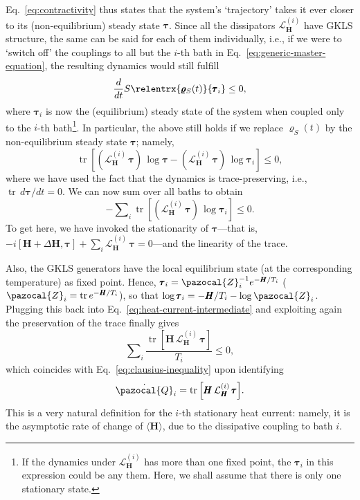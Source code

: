 \documentclass[aps,pra,superscriptaddress,twocolumn,nofootinbib]{revtex4-2}
\newcommand{\relentr}{S\relentrx}
\DeclareMathOperator{\tr}{tr}
\begin{document}
Eq.~\eqref{eq:contractivity} thus states that the system's `trajectory' takes it ever closer to its (non-equilibrium) steady state $\pmb{\tau}$. Since all the dissipators $\mathcal{L}_{\pmb{H}}^{(i)}$ have GKLS structure, the same can be said for each of them individually, i.e., if we were to `switch off' the couplings to all but the $i$-th bath in Eq.~\eqref{eq:generic-master-equation}, the resulting dynamics would still fulfill
\begin{equation*}
    \frac{d}{dt}\relentr{\pmb{\varrho}_S(t)}{\pmb{\tau}_i}\leq 0,
\end{equation*}
where $\pmb{\tau}_i$ is now the (equilibrium) steady state of the system when coupled only to the $i$-th bath\footnote{If the dynamics under $\mathcal{L}_{\pmb{H}}^{(i)}$ has more than one fixed point, the $\pmb{\tau}_i$ in this expression could be any them. Here, we shall assume that there is only one stationary state.}. In particular, the above still holds if we replace $\pmb{\varrho}_S(t)$ by the non-equilibrium steady state $\pmb{\tau}$; namely,
\begin{equation*}
\tr{\left[\left(\mathcal{L}_{\pmb{H}}^{(i)}\,\pmb{\tau}\right)\,\log{\pmb{\tau}} - \left(\mathcal{L}_{\pmb{H}}^{(i)}\,\pmb{\tau}\right)\,\log{\pmb{\tau}_i}\right]} \leq 0,
\end{equation*}
where we have used the fact that the dynamics is trace-preserving, i.e., $\tr\,d\pmb{\tau}/dt = 0$. We can now sum over all baths to obtain
\begin{equation}\label{eq:heat-current-intermediate}
-\sum\nolimits_i\tr{\left[ \left(\mathcal{L}_{\pmb{H}}^{(i)}\,\pmb{\tau}\right)\,\log{\pmb{\tau}_i}\right]} \leq 0.
\end{equation}
To get here, we have invoked the stationarity of $\pmb{\tau}$---that is, $ -i[\pmb{H}+\Delta\pmb{H},\pmb{\tau}] + \sum\nolimits_i \mathcal{L}_{\pmb{H}}^{(i)}\,\pmb{\tau} = 0 $---and the linearity of the trace. 

Also, the GKLS generators have the local equilibrium state (at the corresponding temperature) as fixed point. Hence, $ \pmb{\tau}_i = \pazocal{Z}_i^{-1} e^{-\pmb{H}/T_i} $ ($\pazocal{Z}_i = \tr{e^{-\pmb{H}/T_i}}$), so that $\log{\pmb{\tau}_i} = -\pmb{H}/T_i - \log{\pazocal{Z}_i}$. Plugging this back into Eq.~\eqref{eq:heat-current-intermediate} and exploiting again the preservation of the trace finally gives
\begin{equation*}
    \sum\nolimits_i \frac{\tr{\left[\pmb{H}\,\mathcal{L}_{\pmb{H}}^{(i)}\,\pmb{\tau}\right]}}{T_i} \leq 0,
\end{equation*}
which coincides with Eq.~\eqref{eq:clausius-inequality} upon identifying
\begin{equation}\label{eq:heat-current}
    \dot{\pazocal{Q}}_i = \tr{\left[\pmb{H}\,\mathcal{L}_{\pmb{H}}^{(i)}\,\pmb{\tau}\right]}.
\end{equation}
This is a very natural definition for the $ i $-th stationary heat current: namely, it is the asymptotic rate of change of $\langle\pmb{H}\rangle$, due to the dissipative coupling to bath $ i $. 
\end{document}

